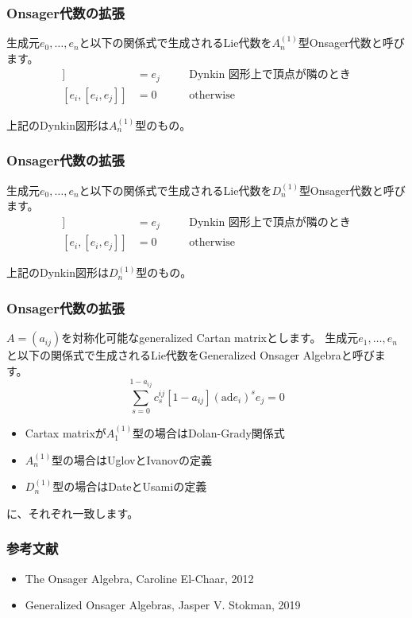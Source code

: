 \documentclass{beamer}
\begin{document}
\begin{frame}
    \frametitle{Onsager代数の拡張}

    \begin{definition}
        生成元$e_0,\dots,e_n$と以下の関係式で生成されるLie代数を$A_n^{(1)}$型Onsager代数と呼びます。
        \begin{align}
            [e_i,[e_i,e_j]] & =e_j & \quad & \text{Dynkin 図形上で頂点が隣のとき} \\
            [e_i,[e_i,e_j]] & =0   & \quad & \text{otherwise}
        \end{align}

        上記のDynkin図形は$A_n^{(1)}$型のもの。

    \end{definition}
\end{frame}

\begin{frame}
    \frametitle{Onsager代数の拡張}

    \begin{definition}
        生成元$e_0,\dots,e_n$と以下の関係式で生成されるLie代数を$D_n^{(1)}$型Onsager代数と呼びます。
        \begin{align}
            [e_i,[e_i,e_j]] & =e_j & \quad & \text{Dynkin 図形上で頂点が隣のとき} \\
            [e_i,[e_i,e_j]] & =0   & \quad & \text{otherwise}
        \end{align}

        上記のDynkin図形は$D_n^{(1)}$型のもの。

    \end{definition}
\end{frame}

\begin{frame}
    \frametitle{Onsager代数の拡張}

    \begin{definition}
        $A=(a_{ij})$を対称化可能なgeneralized Cartan matrixとします。
        生成元$e_1,\dots,e_n$と以下の関係式で生成されるLie代数をGeneralized Onsager Algebraと呼びます。
        \begin{equation}
            ∑_{s=0}^{1-a_{ij}}c_s^{ij}[1-a_{ij}]{(\mathrm{ad}e_i)}^se_j=0
        \end{equation}
    \end{definition}

    \begin{itemize}
        \item Cartax matrixが$A_1^{(1)}$型の場合はDolan-Grady関係式
        \item $A_n^{(1)}$型の場合はUglovとIvanovの定義
        \item $D_n^{(1)}$型の場合はDateとUsamiの定義
    \end{itemize}
    に、それぞれ一致します。
\end{frame}

\begin{frame}
    \frametitle{参考文献}

    \begin{itemize}
        \item The Onsager Algebra, Caroline El-Chaar, 2012
        \item Generalized Onsager Algebras, Jasper V. Stokman, 2019
    \end{itemize}
\end{frame}
\end{document}
